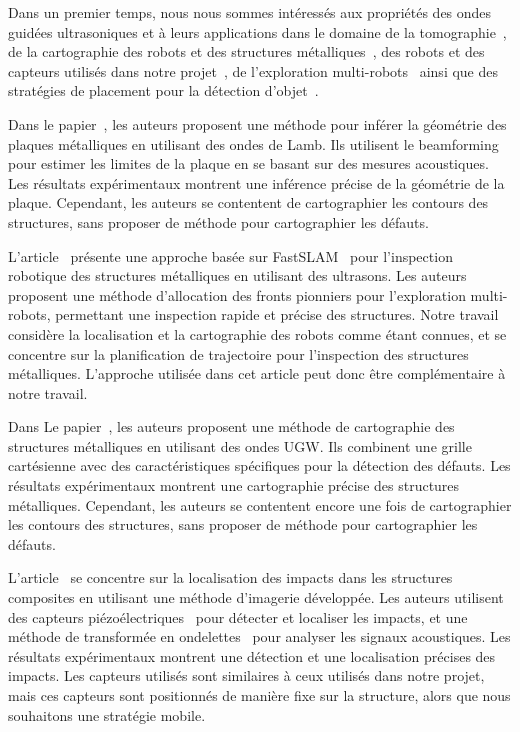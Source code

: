 \documentclass[francais,RandD]{rapportPFE}
\begin{document}
		Dans un premier temps, nous nous sommes intéressés aux propriétés des ondes guidées ultrasoniques et à leurs applications dans le domaine de la tomographie~\cite{OUABI2022106705, HUTHWAITE2013979}, de la cartographie des robots et des structures métalliques~\cite{9364359, 9811581, inventions3030059, 9568841}, des robots et des capteurs utilisés dans notre projet~\cite{s22093235}, de l'exploration multi-robots~\cite{bautin:hal-00757960, articlesvsdf} ainsi que des stratégies de placement pour la détection d'objet~\cite{article455556, 7487624, 7139673}.

		Dans le papier~\cite{OUABI2022106705}, les auteurs proposent une méthode pour inférer la géométrie des plaques métalliques en utilisant des ondes de Lamb.
		Ils utilisent le beamforming~\cite{enwiki:1151960654} pour estimer les limites de la plaque en se basant sur des mesures acoustiques.
		Les résultats expérimentaux montrent une inférence précise de la géométrie de la plaque.
		Cependant, les auteurs se contentent de cartographier les contours des structures, sans proposer de méthode pour cartographier les défauts.

		L'article~\cite{9364359} présente une approche basée sur FastSLAM~\cite{article254524} pour l'inspection robotique des structures métalliques en utilisant des ultrasons.
		Les auteurs proposent une méthode d'allocation des fronts pionniers pour l'exploration multi-robots, permettant une inspection rapide et précise des structures.
		Notre travail considère la localisation et la cartographie des robots comme étant connues, et se concentre sur la planification de trajectoire pour l'inspection des structures métalliques.
		L'approche utilisée dans cet article peut donc être complémentaire à notre travail.

		Dans Le papier~\cite{9811581}, les auteurs proposent une méthode de cartographie des structures métalliques en utilisant des ondes UGW.
		Ils combinent une grille cartésienne avec des caractéristiques spécifiques pour la détection des défauts.
		Les résultats expérimentaux montrent une cartographie précise des structures métalliques.
		Cependant, les auteurs se contentent encore une fois de cartographier les contours des structures, sans proposer de méthode pour cartographier les défauts.

		L'article~\cite{inventions3030059} se concentre sur la localisation des impacts dans les structures composites en utilisant une méthode d'imagerie développée.
		Les auteurs utilisent des capteurs piézoélectriques~\cite{enwiki:1154129092} pour détecter et localiser les impacts, et une méthode de transformée en ondelettes~\cite{enwiki:1147185762} pour analyser les signaux acoustiques.
		Les résultats expérimentaux montrent une détection et une localisation précises des impacts.
		Les capteurs utilisés sont similaires à ceux utilisés dans notre projet, mais ces capteurs sont positionnés de manière fixe sur la structure, alors que nous souhaitons une stratégie mobile.
\end{document}
